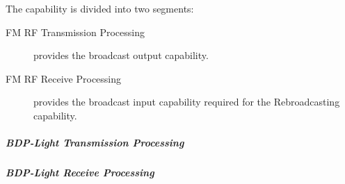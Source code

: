 The \ThisSegment \FM capability is divided into two segments:
\begin{description}
	\item[FM RF Transmission Processing] provides the \FM broadcast output capability.%
	\item[FM RF Receive Processing]  provides the \FM broadcast input  capability required for the Rebroadcasting capability.%
\end{description}

\subparagraph{BDP-Light \FM \RF Transmission Processing}
\label{loc:Light_RF_FM_Transmission}
\renewcommand{\ThisSubSegment}{BDP-Light FM RF\xspace}%


\subparagraph{BDP-Light \FM \RF Receive Processing}
\label{loc:Light_RF_FM_Receive}
\renewcommand{\ThisSubSegment}{BDP-Light FM RF\xspace}%

